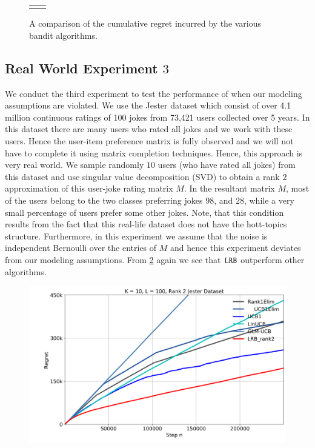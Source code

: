 \begin{figure}[!th]
\begin{tabular}{cc}
{  		\label{fig:4}
    }
    \end{tabular}
    \caption{A comparison of the cumulative regret incurred by the various bandit algorithms. }
    \label{fig:karmed1}
    \vspace*{-1em}
\end{figure}


\subsection{Real World Experiment $3$}
We conduct the third experiment to test the performance of \latentranker when our modeling assumptions are violated. We use the Jester dataset \citep{goldberg2001eigentaste} which consist of over 4.1 million continuous ratings of 100 jokes from 73,421 users collected over 5 years. In this dataset there are many users who rated all jokes and we work with these users. Hence the user-item preference matrix is fully observed and we will not have to complete it using matrix completion techniques. Hence, this approach is very real world. We sample randomly $10$ users (who have rated all jokes) from this dataset and use singular value decomposition (SVD) to obtain a rank $2$ approximation of this user-joke rating matrix $M$. In the resultant matrix $M$, most of the users belong to the two classes preferring jokes $98$, and $28$, while a very small percentage of users prefer some other jokes. Note, that this condition results from the fact that this real-life dataset does not have the hott-topics structure. Furthermore, in this experiment we assume that the noise is independent Bernoulli over the entries of $M$ and hence this experiment deviates from our modeling assumptions. From \ref{fig:6} again we see that ${\tt LRB}$ outperform other algorithms. 
\begin{figure}
    {
    		\includegraphics[scale=0.13]{img/Figure_J_1.png}
  		\label{fig:6}
    }
\end{figure}

